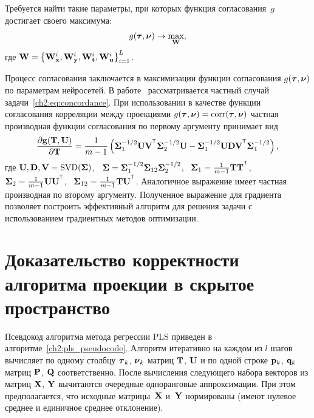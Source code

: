 Требуется найти такие параметры, при которых функция согласования~$g$ достигает своего максимума:
\begin{equation}
	g(\boldsymbol{\tau}, \boldsymbol{\nu}) \rightarrow \max_{\mathbf{W}},
	\label{ch2:eq:concordance}
\end{equation}
где $\mathbf{W} = \bigl\{\mathbf{W}_{\mathbf{x}}^i, \mathbf{W}_{\mathbf{y}}^i, \mathbf{W}_{\mathbf{t}}^i, \mathbf{W}_{\mathbf{u}}^i\bigr\}_{i=1}^L$.

Процесс согласования заключается в максимизации функции согласования $g(\boldsymbol{\tau}, \boldsymbol{\nu})$ по параметрам нейросетей.
В работе~\cite{andrew2013deep} рассматривается частный случай задачи~\eqref{ch2:eq:concordance}. 
При использовании в качестве функции согласования корреляции между проекциями $g(\boldsymbol{\tau}, \boldsymbol{\nu}) = \textnormal{corr}(\boldsymbol{\tau}, \boldsymbol{\nu})$ частная производная функции согласования по первому аргументу принимает вид
\[
	\frac{\partial \mathbf{g}(\bT, \bU)}{\partial \bT} = \frac{1}{m - 1} \left(\bSigma_1^{-1/2} \bU \bV^{\T} \bSigma_2^{-1/2} \bU - \bSigma_1^{-1/2} \bU \bD \bV^{\T} \bSigma_1^{-1/2} \right),
\]
где $\mathbf{U}, \mathbf{D}, \mathbf{V} = \textnormal{SVD}(\boldsymbol{\Sigma})$, \, $\boldsymbol{\Sigma} = \boldsymbol{\Sigma}_1^{-1/2} \boldsymbol{\Sigma}_{12} \boldsymbol{\Sigma}_2^{-1/2} $, \, $\bSigma_1 = \frac{1}{m - 1} \bT \bT^{\T}$, \, $\bSigma_2 = \frac{1}{m - 1} \bU \bU^{\T}$, \, $\bSigma_{12} = \frac{1}{m - 1} \bT \bU^{\T}$.
Аналогичное выражение имеет частная производная по второму аргументу.
Полученное выражение для градиента позволяет построить эффективный алгоритм для решения задачи с использованием градиентных методов оптимизации.

\section{Доказательство корректности алгоритма проекции в скрытое пространство}
\label{sec:ch2:pls_proof}

Псевдокод алгоритма метода регрессии PLS приведен в алгоритме~\ref{ch2:pls_pseudocode}.
Алгоритм итеративно на каждом из $l$ шагов вычисляет по одному столбцу $\boldsymbol{\tau}_k$, $\boldsymbol{\nu}_k$ матриц $\mathbf{T}$, $\mathbf{U}$ и по одной строке $\mathbf{p}_k$, $\mathbf{q}_k$ матриц $\mathbf{P}$, $\mathbf{Q}$ соответственно. 
После вычисления следующего набора векторов из матриц $\mathbf{X}$, $\mathbf{Y}$ вычитаются очередные одноранговые аппроксимации. 
При этом предполагается, что исходные матрицы~$\mathbf{X}$ и~$\mathbf{Y}$ нормированы (имеют нулевое среднее и единичное среднее отклонение).

